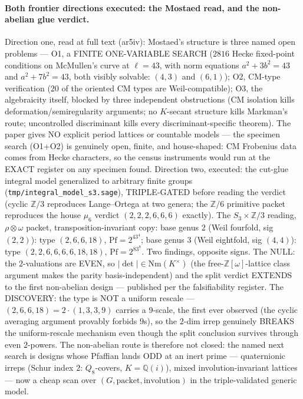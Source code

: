 \documentclass[11pt]{article}
\theoremstyle{definition}
\theoremstyle{remark}
\begin{document}
\paragraph{Both frontier directions executed: the Mostaed read, and
the non-abelian glue verdict.}  Direction one, read at full text
(ar5iv): Mostaed's structure is three named open problems --- O1, a
FINITE ONE-VARIABLE SEARCH ($2816$ Hecke fixed-point conditions on
McMullen's curve at $\ell=43$, with norm equations $a^2+3b^2=43$ and
$a^2+7b^2=43$, both visibly solvable: $(4,3)$ and $(6,1)$); O2, CM-type
verification ($20$ of the oriented CM types are Weil-compatible); O3,
the algebraicity itself, blocked by three independent obstructions
(CM isolation kills deformation/semiregularity arguments; no
$K$-secant structure kills Markman's route; uncontrolled discriminant
kills every discriminant-specific theorem).  The paper gives NO
explicit period lattices or countable models --- the specimen search
(O1+O2) is genuinely open, finite, and house-shaped: CM Frobenius
data comes from Hecke characters, so the census instruments would run
at the EXACT register on any specimen found.  Direction two,
executed: the cut-glue integral model generalized to arbitrary finite
groups (\texttt{tmp/integral\_model\_s3.sage}), TRIPLE-GATED before
reading the verdict (cyclic $\mathbb{Z}/3$ reproduces Lange--Ortega
at two genera; the $\mathbb{Z}/6$ primitive packet reproduces the
house $\mu_6$ verdict $(2,2,2,6,6,6)$ exactly).  The
$S_3\times\mathbb{Z}/3$ reading, $\rho\otimes\omega$ packet,
transposition-invariant copy: base genus $2$ (Weil fourfold, sig
$(2,2)$): type $(2,6,6,18)$, $\mathrm{Pf}=2^43^4$; base genus $3$
(Weil eightfold, sig $(4,4)$): type $(2,2,6,6,6,6,18,18)$,
$\mathrm{Pf}=2^83^8$.  Two findings, opposite signs.  The NULL: the
$2$-valuations are EVEN, so $|{\det}|\in\mathrm{Nm}(K^\times)$ (the
free-$\mathbb{Z}[\omega]$-lattice class argument makes the parity
basis-independent) and the split verdict EXTENDS to the first
non-abelian design --- published per the falsifiability register.
The DISCOVERY: the type is NOT a uniform rescale --- $(2,6,6,18)
=2\cdot(1,3,3,9)$ carries a $9$-scale, the first ever observed (the
cyclic averaging argument provably forbids $9$s), so the $2$-dim
irrep genuinely BREAKS the uniform-rescale mechanism even though the
split conclusion survives through even $2$-powers.  The non-abelian
route is therefore not closed: the named next search is designs
whose Pfaffian lands ODD at an inert prime --- quaternionic irreps
(Schur index $2$: $Q_8$-covers, $K=\mathbb{Q}(i)$), mixed
involution-invariant lattices --- now a cheap scan over
$(G,\text{packet},\text{involution})$ in the triple-validated
generic model.
\end{document}
